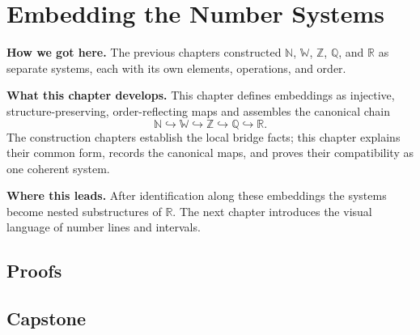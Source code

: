 \chapter{Embedding the Number Systems}
\label{chap:embedding-number-systems}



\begin{tcolorbox}[
  colback=gray!6,
  colframe=gray!40,
  arc=2pt,
  left=8pt, right=8pt, top=6pt, bottom=6pt,
  title={\small\textbf{Structural Roadmap}},
  fonttitle=\small\bfseries
]
\noindent\textbf{How we got here.}
The previous chapters constructed $\mathbb{N}$, $\mathbb{W}$, $\mathbb{Z}$, $\mathbb{Q}$, and $\mathbb{R}$ as separate systems, each with its own elements, operations, and order.

\medskip
\noindent\textbf{What this chapter develops.}
This chapter defines embeddings as injective, structure-preserving, order-reflecting maps and assembles the canonical chain
\[
\mathbb{N}\hookrightarrow\mathbb{W}\hookrightarrow\mathbb{Z}
\hookrightarrow\mathbb{Q}\hookrightarrow\mathbb{R}.
\]
The construction chapters establish the local bridge facts; this chapter explains their common form, records the canonical maps, and proves their compatibility as one coherent system.

\medskip
\noindent\textbf{Where this leads.}
After identification along these embeddings the systems become nested substructures of $\mathbb{R}$. The next chapter introduces the visual language of number lines and intervals.
\end{tcolorbox}



\section*{Proofs}

\section*{Capstone}
